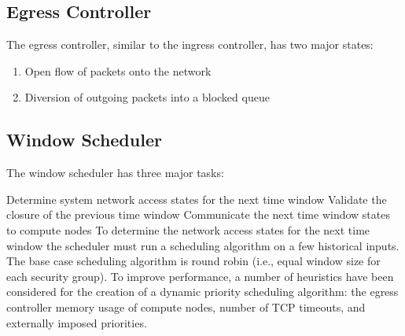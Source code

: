 \documentclass{article}
\begin{document}
\subsection{Egress Controller}
The egress controller, similar to the ingress controller, has two major states:
\begin{enumerate} \itemsep1pt \parskip0pt 
\item Open flow of packets onto the network
\item Diversion of outgoing packets into a blocked queue
\end{enumerate}

\subsection{Window Scheduler}
The window scheduler has three major tasks: 

Determine system network access states for the next time window 
Validate the closure of the previous time window
Communicate the next time window states to compute nodes
To determine the network access states for the next time window the scheduler must run a scheduling algorithm on a few historical inputs. The base case scheduling algorithm is round robin (i.e., equal window size for each security group). To improve performance, a number of heuristics have been considered for the creation of a dynamic priority scheduling algorithm: the egress controller memory usage of compute nodes, number of TCP timeouts, and externally imposed priorities. 
\end{document}
